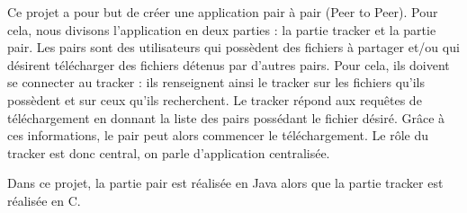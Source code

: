 
Ce projet a pour but de créer une application pair à pair (Peer to Peer). Pour cela, nous divisons l'application en deux parties : la partie tracker et
la partie pair. Les pairs sont des utilisateurs qui possèdent des
fichiers à partager et/ou qui désirent télécharger des fichiers
détenus par d'autres pairs. Pour cela, ils doivent se connecter au
tracker : ils renseignent ainsi le tracker sur les fichiers qu'ils possèdent et sur ceux qu'ils recherchent. Le tracker répond aux requêtes de téléchargement en
donnant la liste des pairs possédant le fichier désiré. Grâce à ces
informations, le pair peut alors commencer le téléchargement.  Le rôle
du tracker est donc central, on parle d'application centralisée.

Dans ce projet, la partie pair est réalisée en Java alors que la
partie tracker est réalisée en C.

